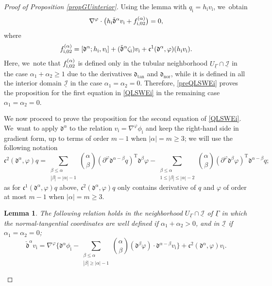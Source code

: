 \documentclass[JEP,XML,SOM,Unicode,NoFloatCountersInSection,published]{cedram}
\newcommand{\dtan}{{\mathfrak d}_\mathrm{tan}}
\newcommand{\dnor}{{\mathfrak d}_\mathrm{nor}}
\newcommand{\cI}{{\mathcal I}}
\newcommand{\ul}[1]{\underline{#1}}
\newcommand{\itGamma}{\mathit{\Gamma}}
\newcommand{\cmfalpha}{\check{\mathfrak{d}}^{\alpha}}
\newtheorem{lemma}[theorem]{Lemma}
\theoremstyle{definition}
\begin{document}
\begin{proof}[Proof of Proposition \ref{propGUinterior}]
Using the lemma with $q_\mathrm{i}=h_\mathrm{i}v_\mathrm{i}$, we~obtain
\begin{equation}\label{preQLSWEi}
\nabla^\varphi\cdot\bigl(h_\mathrm{i} \cmfalpha v_\mathrm{i} + f_{{\rm i},02}^{(\alpha)} \bigr)=0,
\end{equation}
where
\begin{equation}\label{deffi02}
f_{{\rm i},02}^{(\alpha)}
= [\mathfrak{d}^{\alpha}; h_\mathrm{i},v_\mathrm{i}] + (\cmfalpha \zeta_\mathrm{i})v_\mathrm{i} + \mathfrak{c}^1({\mathfrak d}^\alpha,\varphi)(h_\mathrm{i} v_\mathrm{i}).
\end{equation}
Here, we~note that $f_{{\rm i},02}^{(\alpha)}$ is defined only in the tubular neighborhood $U_{\ul{\itGamma}}\cap\ul{\cI}$ in the case $\alpha_1+\alpha_2\geq1$
due to the derivatives $\dtan$ and $\dnor$, while it is defined in all the interior domain $\ul{\cI}$ in the case $\alpha_1=\alpha_2=0$.
Therefore, \eqref{preQLSWEi} proves the proposition for the first equation in \eqref{QLSWEi} in the remaining case $\alpha_1=\alpha_2=0$.

We now proceed to prove the proposition for the second equation of \eqref{QLSWEi}. We~want to apply ${\mathfrak d}^\alpha$ to the relation $v_\mathrm{i}=\nabla^\varphi \phi_\mathrm{i}$ and keep the right-hand side in gradient form,
up to terms of order $m-1$ when $|\alpha|=m\geq 3$; we will use the following notation
\[
\mathfrak{c}^2({\mathfrak d}^\alpha,\varphi)q=
\sum_{\substack{\beta\leq\alpha\\ |\beta|=|\alpha|-1}} \binom{\alpha}{\beta} (\partial^\varphi\mathfrak{d}^{\alpha-\beta}q)^\mathrm{T}\mathfrak{d}^{\beta}\varphi
- \sum_{\substack{\beta\leq\alpha\\ 1\leq|\beta|\leq|\alpha|-2}} \binom{\alpha}{\beta}
(\partial^\varphi\mathfrak{d}^{\beta}\varphi)^\mathrm{T}\mathfrak{d}^{\alpha-\beta}q;
\]
as for $\mathfrak{c}^1({\mathfrak d}^\alpha,\varphi)q$ above,
$\mathfrak{c}^2({\mathfrak d}^\alpha,\varphi)q$ only contains derivative of $q$ and $\varphi$ of order at most $m-1$ when $\vert \alpha\vert=m\geq 3$.

\begin{lemma}
The following relation holds in the neighborhood $U_{\ul{\itGamma}}\cap \ul{\cI}$ of $\underline{\itGamma}$
in which the normal-tangential coordinates are well defined if $\alpha_1+\alpha_2>0$, and in $\ul{\cI}$ if $\alpha_1=\alpha_2=0$;
\begin{equation}\label{preQLSWEi2}
\cmfalpha v_\mathrm{i}= \nabla^\varphi\biggl\{ \mathfrak{d}^{\alpha}\phi_\mathrm{i}
- \sum_{\substack{\beta\leq\alpha\\ |\beta|\geq|\alpha|-1}} \binom{\alpha}{\beta} (\mathfrak{d}^{\beta}\varphi)\cdot\mathfrak{d}^{\alpha-\beta}v_\mathrm{i} \biggr\}
+\mathfrak{c}^2({\mathfrak d}^\alpha,\varphi)v_\mathrm{i}.
\end{equation}
\end{lemma}


\end{proof}
\end{document}
